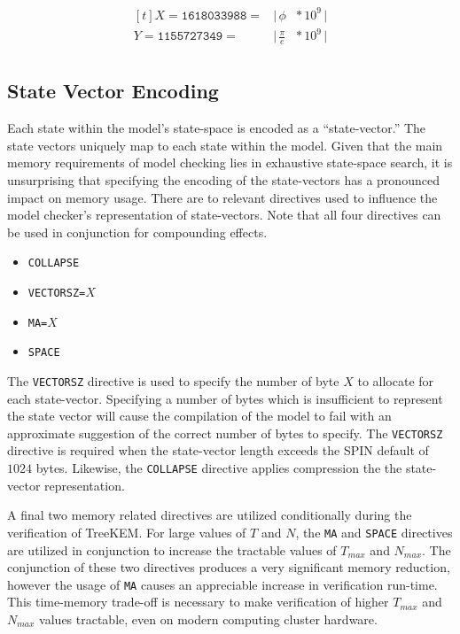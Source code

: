 \begin{equation}
\begin{aligned}[t]
X = \texttt{1618033988} = & \bigg | \, \phi          \!\!\!\! & * \, 10^9 \, \bigg |\\
Y = \texttt{1155727349} = & \bigg | \, \frac{\pi}{e} \!\!\!\! & * \, 10^9 \, \bigg |\\
\end{aligned}
\end{equation}


\hypertarget{state-vector-encoding}{%
\subsection{State Vector Encoding}\label{state-vector-encoding}}

Each state within the model's state-space is encoded as a ``state-vector.''
The state vectors uniquely map to each state within the model.
Given that the main memory requirements of model checking lies in exhaustive state-space search, it is unsurprising that specifying the encoding of the state-vectors has a pronounced impact on memory usage.
There are to relevant directives used to influence the model checker's representation of state-vectors.
Note that all four directives can be used in conjunction for compounding effects.

\begin{itemize}
\item \texttt{COLLAPSE}
\item \texttt{VECTORSZ=}\(X\)
\item \texttt{MA=}\(X\)
\item \texttt{SPACE}
\end{itemize}

The \texttt{VECTORSZ} directive is used to specify the number of byte \(X\) to allocate for each state-vector.
Specifying a number of bytes which is insufficient to represent the state vector will cause the compilation of the model to fail with an approximate suggestion of the correct number of bytes to specify.
The \texttt{VECTORSZ} directive is required when the state-vector length exceeds the SPIN default of \(1024\) bytes.
Likewise, the \texttt{COLLAPSE} directive applies compression the the state-vector representation.

A final two memory related directives are utilized conditionally during the verification of TreeKEM.
For large values of \(T\) and \(N\), the \texttt{MA} and \texttt{SPACE} directives are utilized in conjunction to increase the tractable values of \(T_{max}\) and \(N_{max}\).
The conjunction of these two directives produces a very significant memory reduction, however the usage of \texttt{MA} causes an appreciable increase in verification run-time.
This time-memory trade-off is necessary to make verification of higher \(T_{max}\) and \(N_{max}\) values tractable, even on modern computing cluster hardware.


